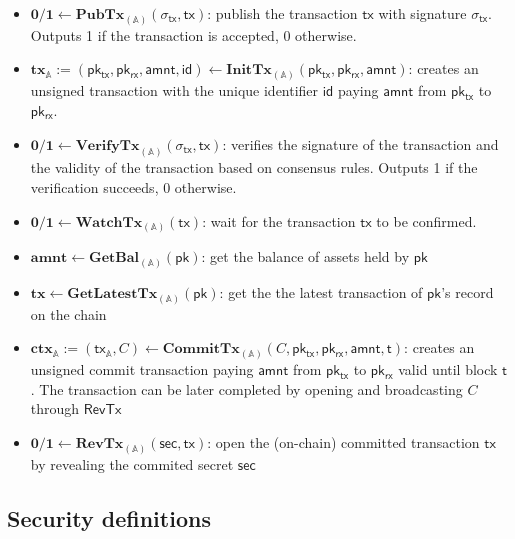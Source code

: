 \documentclass{article}      	%
\begin{document}
\begin{itemize}[topsep=0pt, itemsep=0pt, leftmargin=2em]
    \item $\mathbf{0/1} \leftarrow \mathbf{PubTx}_{(\mathbb{A})}(\sigma_{\mathsf{tx}}, \mathsf{tx})$: publish the transaction $\mathsf{tx}$ with signature $\sigma_{\mathsf{tx}}$. Outputs 1 if the transaction is accepted, 0 otherwise.
    \item $\mathbf{tx}_{\mathbb{A}} := (\mathsf{pk_{tx}}, \mathsf{pk_{rx}}, \mathsf{amnt}, \mathsf{id})  \leftarrow \mathbf{InitTx}_{(\mathbb{A})}(\mathsf{pk_{tx}}, \mathsf{pk_{rx}}, \mathsf{amnt})$: creates an unsigned transaction with the unique identifier $\mathsf{id}$ paying $\mathsf{amnt}$ from $\mathsf{pk_{tx}}$ to $\mathsf{pk_{rx}}$.
    \item $\mathbf{0/1} \leftarrow \mathbf{VerifyTx}_{(\mathbb{A})}(\sigma_{\mathsf{tx}}, \mathsf{tx})$: verifies the signature of the transaction and the validity of the transaction based on consensus rules. Outputs 1 if the verification succeeds, 0 otherwise.
    \item $\mathbf{0/1} \leftarrow \mathbf{WatchTx}_{(\mathbb{A})}(\mathsf{tx})$: wait for the transaction $\mathsf{tx}$ to be confirmed.
    \item $\mathbf{amnt} \leftarrow \mathbf{GetBal}_{(\mathbb{A})}(\mathsf{pk})$: get the balance of assets held by $\mathsf{pk}$
    \item $\mathbf{tx} \leftarrow \mathbf{GetLatestTx}_{(\mathbb{A})}(\mathsf{pk})$: get the the latest transaction of $\mathsf{pk}$'s record on the chain
    \item $\mathbf{ctx}_{\mathbb{A}} := (\mathsf{tx_{\mathbb{A}}}, C) \leftarrow \mathbf{CommitTx}_{(\mathbb{A})}(C, \mathsf{pk_{tx}}, \mathsf{pk_{rx}}, \mathsf{amnt}, \mathsf{t})$: creates an unsigned commit transaction paying $\mathsf{amnt}$ from $\mathsf{pk_{tx}}$ to $\mathsf{pk_{rx}}$ valid until block $\mathsf{t}$. The transaction can be later completed by opening and broadcasting $C$ through $\mathsf{RevTx}$
    \item $ \mathbf{0/1} \leftarrow \mathbf{RevTx}_{(\mathbb{A})}(\mathsf{sec}, \mathsf{tx})$: open the (on-chain) committed transaction $\mathsf{tx}$ by revealing the commited secret $\mathsf{sec}$
\end{itemize}

\subsection{Security definitions}
\end{document}
